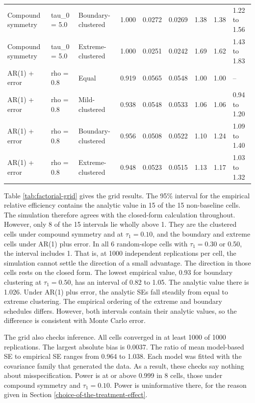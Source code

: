 \documentclass[
  11pt,
]{article}
\begin{document}
\begin{table}[!h]
{\begin{tabular}[t]{lllrrrrrl}
Compound symmetry & tau\_0 = 5.0 & Boundary-clustered & 1.000 & 0.0272 & 0.0269 & 1.38 & 1.38 & 1.22 to 1.56\\
\addlinespace
Compound symmetry & tau\_0 = 5.0 & Extreme-clustered & 1.000 & 0.0251 & 0.0242 & 1.69 & 1.62 & 1.43 to 1.83\\
AR(1) + error & rho = 0.8 & Equal & 0.919 & 0.0565 & 0.0548 & 1.00 & 1.00 & --\\
AR(1) + error & rho = 0.8 & Mild-clustered & 0.938 & 0.0548 & 0.0533 & 1.06 & 1.06 & 0.94 to 1.20\\
AR(1) + error & rho = 0.8 & Boundary-clustered & 0.956 & 0.0508 & 0.0522 & 1.10 & 1.24 & 1.09 to 1.40\\
AR(1) + error & rho = 0.8 & Extreme-clustered & 0.948 & 0.0523 & 0.0515 & 1.13 & 1.17 & 1.03 to 1.32\\
\bottomrule
\end{tabular}}
\end{table}

Table \ref{tab:factorial-grid} gives the grid results. The 95\%
interval for the empirical relative efficiency contains the
analytic value in 15 of the 15 non-baseline
cells. The simulation therefore agrees
with the closed-form calculation throughout. However, only
8 of the 15 intervals lie wholly above 1.
They are the clustered cells under compound symmetry and at
\(\tau_1 = 0.10\), and the boundary and extreme cells under AR(1)
plus error. In all
6 random-slope cells with \(\tau_1 = 0.30\) or 0.50,
the interval includes 1. That is, at 1000
independent replications per cell, the simulation cannot settle
the direction of a small advantage. The direction in those cells
rests on the closed form. The lowest empirical value,
0.93
for boundary clustering at \(\tau_1 = 0.50\), has an interval of
0.82 to 1.05. The analytic value there is
1.026. Under AR(1) plus
error, the analytic SEs fall steadily from equal to extreme
clustering. The empirical ordering of the extreme and boundary
schedules differs. However, both intervals contain their analytic
values, so the difference is consistent with Monte Carlo error.

The grid also checks inference. All cells converged in at least
1000 of 1000 replications. The
largest absolute bias is 0.0037. The
ratio of mean model-based SE to empirical SE ranges from
0.964 to
1.038. Each model was fitted with
the covariance family that generated the data. As a result, these
checks say nothing about misspecification. Power is at or above
0.999 in 8 cells, those under compound symmetry and
\(\tau_1 = 0.10\). Power is uninformative there, for the reason
given in Section \ref{choice-of-the-treatment-effect}.
\end{document}
